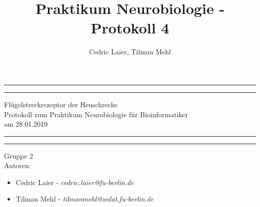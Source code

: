 \documentclass[a4paper]{article}
\title{Praktikum Neurobiologie - Protokoll 4}
\author{Cedric Laier, Tilman Mehl}
\begin{document}
\begin{titlepage} %

	\centering %
	
	\scshape %
	
	\vspace*{\baselineskip} %
	
	
	\rule{\textwidth}{1.6pt}\vspace*{-\baselineskip}\vspace*{2pt} %
	\rule{\textwidth}{0.4pt} %
	\vspace{0.75\baselineskip} %
	{\LARGE Flügelstreckrezeptor der Heuschrecke} {\\Protokoll zum Praktikum Neurobiologie für Bioinformatiker\\ am 28.01.2019} %

	
	\vspace{0.75\baselineskip} %
	
	\rule{\textwidth}{0.4pt}\vspace*{-\baselineskip}\vspace{3.2pt} %
	\rule{\textwidth}{1.6pt} %
	
	\vspace{2\baselineskip} %
	
	\vspace{2.0\baselineskip} %

{\LARGE Gruppe 2}
\vspace{2.5\baselineskip} \\
	
{\LARGE Autoren:}
\begin{itemize}
\item Cedric Laier - \textit{cedric.laier@fu-berlin.de}
\item Tilman Mehl - \textit{tilmanmehl@zedat.fu-berlin.de}
\end{itemize}
\vspace{2.5\baselineskip}


\end{titlepage}
\end{document}
